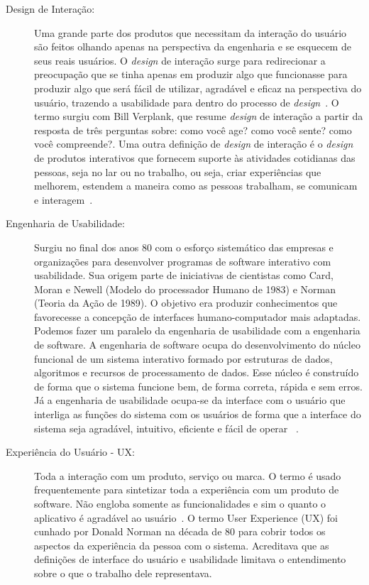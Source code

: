 \begin{description}
\item[Design de Interação:]

Uma grande parte dos produtos que necessitam da interação do usuário são feitos olhando apenas na perspectiva da engenharia e se esquecem de seus reais usuários. O \emph{design} de interação surge para redirecionar a preocupação que se tinha apenas em produzir algo que funcionasse para produzir algo que será fácil de utilizar, agradável e eficaz na perspectiva do usuário, trazendo a usabilidade para dentro do processo de \emph{design}~\cite{preece2007}.
%
O termo surgiu com Bill Verplank, que resume \emph{design} de interação a partir da resposta de três perguntas sobre: como você age? como você sente? como você compreende?\cite{moggridge2006}. 
%
Uma outra definição de \emph{design} de interação é o \emph{design} de produtos interativos que fornecem suporte às atividades cotidianas das pessoas, seja no lar ou no trabalho, ou seja, criar experiências que melhorem, estendem a maneira como as pessoas trabalham, se comunicam e interagem~\cite{preece2007}.


\item[Engenharia de Usabilidade:]

Surgiu no final dos anos 80 com o esforço sistemático das empresas e organizações para desenvolver programas de software interativo com usabilidade. Sua origem parte de iniciativas de cientistas como Card, Moran e Newell (Modelo do processador Humano de 1983) e Norman (Teoria da Ação de 1989). O objetivo era produzir conhecimentos que favorecesse a concepção de interfaces humano-computador mais adaptadas.
%
Podemos fazer um paralelo da engenharia de usabilidade com a engenharia de software. A engenharia de software ocupa do desenvolvimento do núcleo funcional de um sistema interativo formado por estruturas de dados, algoritmos e recursos de processamento de dados. Esse núcleo é construído de forma que o sistema funcione bem, de forma correta, rápida e sem erros. Já a engenharia de usabilidade ocupa-se da interface com o usuário que interliga as funções do sistema com os usuários de forma que a interface do sistema seja agradável, intuitivo, eficiente e fácil de operar ~\cite{cybis2010}.
%
%

\item[Experiência do Usuário - UX: ]

Toda a interação com um produto, serviço ou marca. O termo é usado frequentemente para sintetizar toda a experiência com um produto de software. Não engloba  somente as funcionalidades e sim o quanto o aplicativo é  agradável ao usuário~\cite{travis2013}.
%	
O termo User Experience (UX) foi cunhado por Donald Norman na década de 80 para cobrir todos os aspectos da experiência da pessoa com o sistema. Acreditava que as definições de interface do usuário e usabilidade limitava o entendimento sobre o que o trabalho dele representava. 
%

\end{description}

